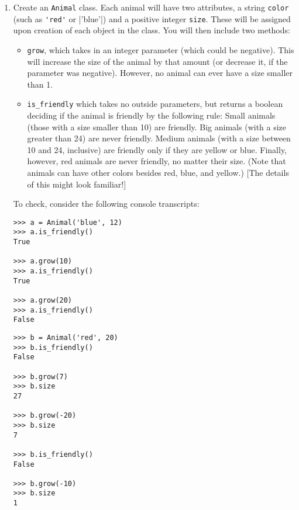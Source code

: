 \documentclass{article}
\begin{document}
\begin{enumerate}


\item  Create an \verb|Animal| class. Each animal will have two attributes, a string \verb|color| (such as \verb|'red'| or |'blue'|) and a positive integer \verb|size|. These will be assigned upon creation of each object in the class. You will then include two methods:

    \begin{itemize}
      \item \verb|grow|, which takes in an integer parameter (which could be negative). This will increase the size of the animal by that amount (or decrease it, if the parameter was negative). However, no animal can ever have a size smaller than 1.
      \item \verb|is_friendly| which takes no outside parameters, but returns a boolean deciding if the animal is friendly by the following rule: Small animals (those with a size smaller than 10) are friendly. Big animals (with a size greater than 24) are never friendly. Medium animals (with a size between 10 and 24, inclusive) are friendly only if they are yellow or blue. Finally, however, red animals are never friendly, no matter their size.  (Note that animals
  can have other colors besides red, blue, and yellow.) [The details of this might look familiar!]
    \end{itemize}

    To check, consider the following console transcripts:

    \begin{verbatim}
>>> a = Animal('blue', 12)
>>> a.is_friendly()
True

>>> a.grow(10)
>>> a.is_friendly()
True

>>> a.grow(20)
>>> a.is_friendly()
False

    \end{verbatim}

    \begin{verbatim}
>>> b = Animal('red', 20)
>>> b.is_friendly()
False

>>> b.grow(7)
>>> b.size
27

>>> b.grow(-20)
>>> b.size
7

>>> b.is_friendly()
False

>>> b.grow(-10)
>>> b.size
1
    \end{verbatim}


\end{enumerate}
\end{document}
